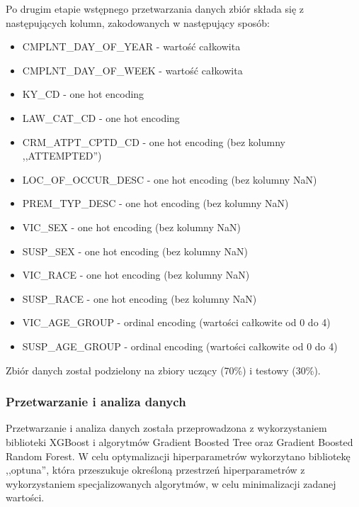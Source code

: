 \documentclass{classrep}
\begin{document}
{{{                Po drugim etapie wstępnego przetwarzania danych zbiór składa się z
                następujących kolumn, zakodowanych w następujący sposób:
                \begin{itemize}
                    \item CMPLNT\_DAY\_OF\_YEAR - wartość całkowita
                    \item CMPLNT\_DAY\_OF\_WEEK - wartość całkowita
                    \item KY\_CD - one hot encoding
                    \item LAW\_CAT\_CD - one hot encoding
                    \item CRM\_ATPT\_CPTD\_CD - one hot encoding (bez kolumny ,,ATTEMPTED'')
                    \item LOC\_OF\_OCCUR\_DESC - one hot encoding (bez kolumny NaN)
                    \item PREM\_TYP\_DESC - one hot encoding (bez kolumny NaN)
                    \item VIC\_SEX - one hot encoding (bez kolumny NaN)
                    \item SUSP\_SEX - one hot encoding (bez kolumny NaN)
                    \item VIC\_RACE - one hot encoding (bez kolumny NaN)
                    \item SUSP\_RACE - one hot encoding (bez kolumny NaN)
                    \item VIC\_AGE\_GROUP - ordinal encoding (wartości całkowite od 0 do 4)
                    \item SUSP\_AGE\_GROUP - ordinal encoding (wartości całkowite od 0 do 4)
                \end{itemize}
                
                Zbiór danych został podzielony na zbiory uczący (70\%) i testowy (30\%).
            }

            \subsubsection{Przetwarzanie i analiza danych} {
                Przetwarzanie i analiza danych została przeprowadzona z wykorzystaniem
                biblioteki XGBoost i algorytmów Gradient Boosted Tree oraz Gradient
                Boosted Random Forest. W celu optymalizacji hiperparametrów wykorzytano
                bibliotekę ,,optuna'', która przeszukuje określoną przestrzeń
                hiperparametrów z wykorzystaniem specjalizowanych algorytmów, w celu
                minimalizacji zadanej wartości.

}}}
\end{document}
